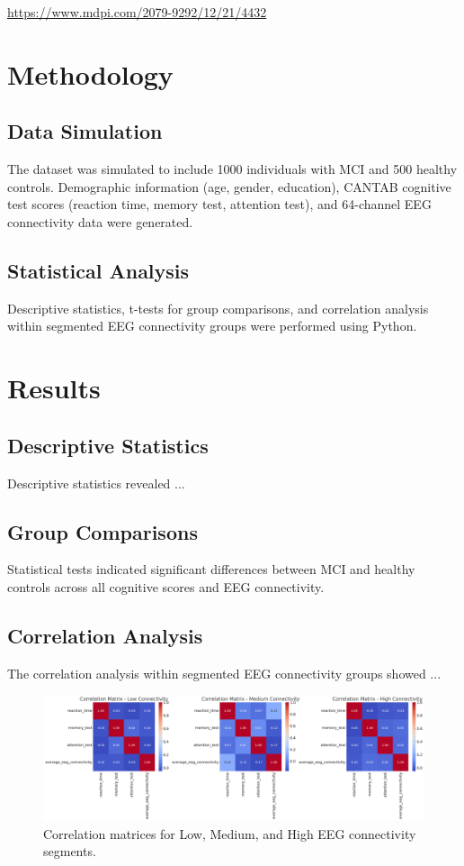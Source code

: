\documentclass{article}
\begin{document}
{\small{\url{https://www.mdpi.com/2079-9292/12/21/4432}}

\section{Methodology}
\subsection{Data Simulation}
The dataset was simulated to include 1000 individuals with MCI and 500 healthy controls. Demographic information (age, gender, education), CANTAB cognitive test scores (reaction time, memory test, attention test), and 64-channel EEG connectivity data were generated.

\subsection{Statistical Analysis}
Descriptive statistics, t-tests for group comparisons, and correlation analysis within segmented EEG connectivity groups were performed using Python.

\section{Results}
\subsection{Descriptive Statistics}
Descriptive statistics revealed ...

\subsection{Group Comparisons}
Statistical tests indicated significant differences between MCI and healthy controls across all cognitive scores and EEG connectivity.

\subsection{Correlation Analysis}
The correlation analysis within segmented EEG connectivity groups showed ...

\begin{figure}[h]
\centering
\includegraphics[width=\textwidth]{correlation_matrices.png}
\caption{Correlation matrices for Low, Medium, and High EEG connectivity segments.}
\label{fig:corr_matrices}
\end{figure}

}
\end{document}
